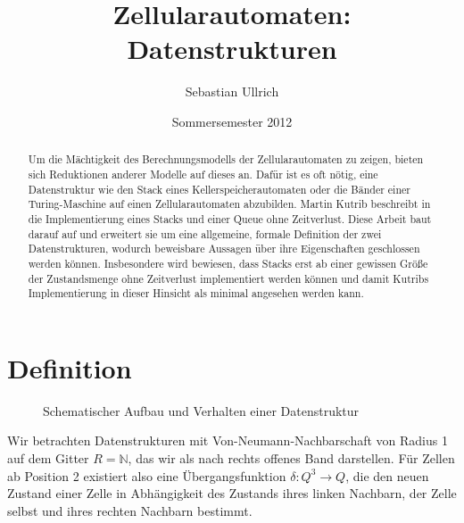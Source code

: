 \documentclass{article}
\title{Zellularautomaten: Datenstrukturen}
\author{Sebastian Ullrich}
\date{Sommersemester 2012}
\begin{document}
\newcommand{\ca}{\ensuremath\mathcal{A}}
\newcommand{\abs}[1]{\lvert#1\rvert}
\newcommand{\ceil}[1]{\lceil#1\rceil}
\newcommand{\zrange}[1]{\mathbb{G}_{#1}}
\newcommand{\bild}[1]{\text{Bild}(#1)}
\newcommand{\N}{\mathbb{N}}
\newcommand{\ve}[3]{\begin{pmatrix}#1\\#2\\#3\end{pmatrix}}

\maketitle
\newpage

\begin{abstract}
    Um die Mächtigkeit des Berechnungsmodells der Zellularautomaten zu zeigen, bieten sich Reduktionen anderer Modelle auf dieses an. Dafür ist es oft nötig, eine Datenstruktur wie den Stack eines Kellerspeicherautomaten oder die Bänder einer Turing-Maschine auf einen Zellularautomaten abzubilden. Martin Kutrib beschreibt in \cite{kutrib08} die Implementierung eines Stacks und einer Queue ohne Zeitverlust. Diese Arbeit baut darauf auf und erweitert sie um eine allgemeine, formale Definition der zwei Datenstrukturen, wodurch beweisbare Aussagen über ihre Eigenschaften geschlossen werden können. Insbesondere wird bewiesen, dass Stacks erst ab einer gewissen Größe der Zustandsmenge ohne Zeitverlust implementiert werden können und damit Kutribs Implementierung in dieser Hinsicht als minimal angesehen werden kann.
\end{abstract}

\section{Definition}

\begin{figure}[h]
    \centering
    \caption{Schematischer Aufbau und Verhalten einer Datenstruktur}
\end{figure}
Wir betrachten Datenstrukturen mit Von-Neumann-Nachbarschaft von Radius 1 auf dem Gitter $R = \N$, das wir als nach rechts offenes Band darstellen. Für Zellen ab Position 2 existiert also eine Übergangsfunktion $\delta : Q^3 \rightarrow Q$, die den neuen Zustand einer Zelle in Abhängigkeit des Zustands ihres linken Nachbarn, der Zelle selbst und ihres rechten Nachbarn bestimmt.
\end{document}
